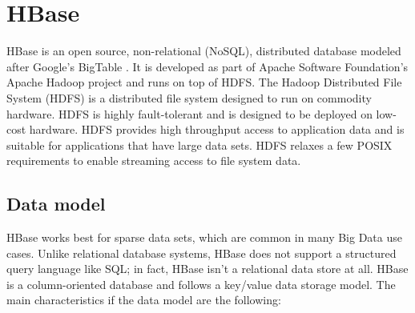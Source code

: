 \section{HBase}

HBase is an open source, non-relational (NoSQL), distributed database modeled after Google's BigTable \cite{24}. It is developed as part of Apache Software Foundation's Apache 
Hadoop project and runs on top of HDFS. The Hadoop Distributed File System (HDFS) is a distributed file system designed to run on commodity hardware. 
HDFS is highly fault-tolerant and is designed to be deployed on low-cost hardware. HDFS provides high throughput access to application data and is suitable 
for applications that have large data sets. HDFS relaxes a few POSIX requirements to enable streaming access to file system data. 

\subsection{Data model}

HBase works best for sparse data sets, which are common in many Big Data use cases. Unlike relational database systems, HBase does not support a 
structured query language like SQL; in fact, HBase isn’t a relational data store at all. HBase  is a column-oriented database and follows a 
key/value data storage model. The main characteristics if the data model are the following: 


